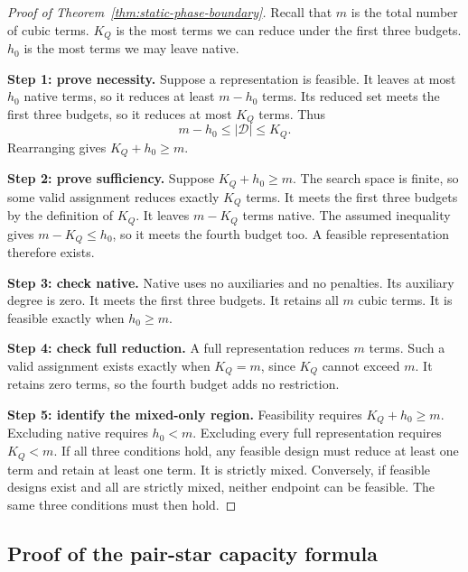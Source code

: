 \documentclass[a4paper,onecolumn,11pt,unpublished]{quantumarticle}
\theoremstyle{remark}
\begin{document}
\begin{proof}[Proof of Theorem~\ref{thm:static-phase-boundary}]
Recall that $m$ is the total number of cubic terms.
$K_Q$ is the most terms we can reduce under the first three budgets.
$h_0$ is the most terms we may leave native.

\textbf{Step 1: prove necessity.}
Suppose a representation is feasible. It leaves at most $h_0$ native terms,
so it reduces at least $m-h_0$ terms. Its reduced set meets the first three
budgets, so it reduces at most $K_Q$ terms. Thus
\[
m-h_0\leq|\mathcal D|\leq K_Q.
\]
Rearranging gives $K_Q+h_0\geq m$.

\textbf{Step 2: prove sufficiency.}
Suppose $K_Q+h_0\geq m$. The search space is finite, so some valid
assignment reduces exactly $K_Q$ terms. It meets the first three budgets
by the definition of $K_Q$. It leaves $m-K_Q$ terms native.
The assumed inequality gives $m-K_Q\leq h_0$, so it meets the fourth
budget too. A feasible representation therefore exists.

\textbf{Step 3: check native.}
Native uses no auxiliaries and no penalties. Its auxiliary degree is zero.
It meets the first three budgets. It retains all $m$ cubic terms.
It is feasible exactly when $h_0\geq m$.

\textbf{Step 4: check full reduction.}
A full representation reduces $m$ terms. Such a valid assignment exists
exactly when $K_Q=m$, since $K_Q$ cannot exceed $m$.
It retains zero terms, so the fourth budget adds no restriction.

\textbf{Step 5: identify the mixed-only region.}
Feasibility requires $K_Q+h_0\geq m$.
Excluding native requires $h_0<m$.
Excluding every full representation requires $K_Q<m$.
If all three conditions hold, any feasible design must reduce at least one
term and retain at least one term. It is strictly mixed.
Conversely, if feasible designs exist and all are strictly mixed, neither
endpoint can be feasible. The same three conditions must then hold.
\end{proof}

\subsection{Proof of the pair-star capacity formula}
\label{app:pair-star-proof-steps}
\end{document}
